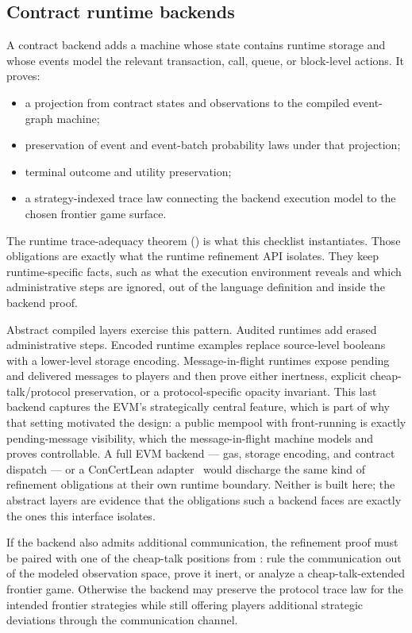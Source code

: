 \subsection{Contract runtime backends}

A contract backend adds a machine whose state contains runtime storage
and whose events model the relevant transaction, call, queue, or
block-level actions.  It proves:
\begin{itemize}\itemsep1pt
\item a projection from contract states and observations to the compiled
  event-graph machine;
\item preservation of event and event-batch probability laws under that
  projection;
\item terminal outcome and utility preservation;
\item a strategy-indexed trace law connecting the backend execution
  model to the chosen frontier game surface.
\end{itemize}
The runtime trace-adequacy theorem () is what
this checklist instantiates.  Those obligations are exactly what the
runtime refinement API isolates.  They keep runtime-specific facts, such
as what the execution environment reveals and which administrative steps
are ignored, out of the language definition and inside the backend
proof.

Abstract compiled layers exercise this pattern.  Audited runtimes add
erased administrative steps.  Encoded runtime examples replace
source-level booleans with a lower-level storage encoding.
Message-in-flight runtimes expose pending and delivered messages to
players and then prove either inertness, explicit cheap-talk/protocol
preservation, or a protocol-specific opacity invariant.  This last
backend captures the EVM's strategically central feature, which is part of
why that setting motivated the design: a public mempool with front-running is
exactly pending-message visibility, which the message-in-flight machine models
and proves controllable.  A full EVM backend --- gas, storage encoding, and
contract dispatch --- or a ConCertLean adapter~\citep{GershuniConCertLean}
would discharge the same kind of refinement obligations at their own runtime
boundary.  Neither is built here; the abstract layers are evidence that the
obligations such a backend faces are exactly the ones this interface isolates.

If the backend also admits additional communication, the refinement proof
must be paired with one of the cheap-talk positions from
: rule the communication out of the modeled
observation space, prove it inert, or analyze a cheap-talk-extended
frontier game.  Otherwise the backend may preserve the protocol trace
law for the intended frontier strategies while still offering players
additional strategic deviations through the communication channel.

